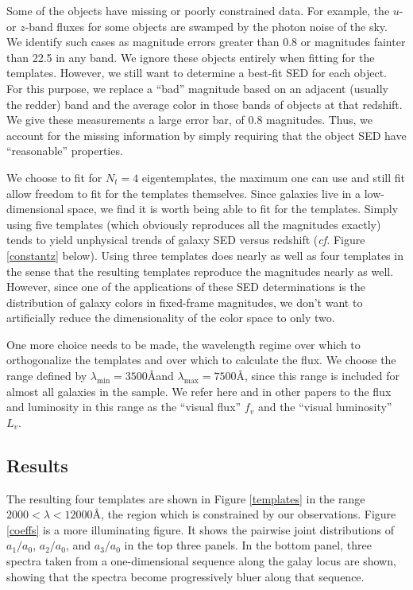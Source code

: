 \documentclass[10pt,preprint]{aastex}
\begin{document}
Some of the objects have missing or poorly constrained data. For
example, the $u$- or $z$-band fluxes for some objects are swamped by
the photon noise of the sky. We identify such cases as magnitude
errors greater than 0.8 or magnitudes fainter than 22.5 in any
band. We ignore these objects entirely when fitting for the
templates. However, we still want to determine a best-fit SED for each
object. For this purpose, we replace a ``bad'' magnitude based on an
adjacent (usually the redder) band and the average color in those
bands of objects at that redshift. We give these measurements a large
error bar, of 0.8 magnitudes. Thus, we account for the missing
information by simply requiring that the object SED have
``reasonable'' properties.

We choose to fit for $N_t = 4$ eigentemplates, the maximum one can use
and still fit allow freedom to fit for the templates themselves. Since
galaxies live in a low-dimensional space, we find it is worth being
able to fit for the templates. Simply using five templates (which
obviously reproduces all the magnitudes exactly) tends to yield
unphysical trends of galaxy SED versus redshift ({\it cf.}  Figure
\ref{constantz} below). Using three templates does nearly as well as
four templates in the sense that the resulting templates reproduce the
magnitudes nearly as well. However, since one of the applications of
these SED determinations is the distribution of galaxy colors in
fixed-frame magnitudes, we don't want to artificially reduce the
dimensionality of the color space to only two.

One more choice needs to be made, the wavelength regime over which to
orthogonalize the templates and over which to calculate the flux. We
choose the range defined by $\lambda_{\mathrm{min}}=3500$\AA and
$\lambda_{\mathrm{max}}=7500$\AA, since this range is included for
almost all galaxies in the sample. We refer here and in other papers
to the flux and luminosity in this range as the ``visual flux'' $f_v$
and the ``visual luminosity'' $L_v$.

\subsection{Results}

The resulting four templates are shown in Figure \ref{templates} in
the range $2000<\lambda<12000$\AA, the region which is constrained by
our observations. Figure \ref{coeffs} is a more illuminating
figure. It shows the pairwise joint distributions of $a_1/a_0$,
$a_2/a_0$, and $a_3/a_0$ in the top three panels. In the bottom panel,
three spectra taken from a one-dimensional sequence along the galay
locus are shown, showing that the spectra become progressively bluer
along that sequence.
\end{document}
